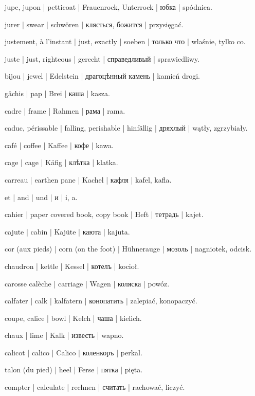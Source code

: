 \begin{outdent}{1em}
jupe, jupon | petticoat | Frauenrock, Unterrock | юбка | spódnica.

jurer | swear | schwören | клясться, божится | przysięgać.

justement, à l’instant | just, exactly | soeben | только что | wlaśnie, tylko co.

juste | just, righteous | gerecht | справедливый | sprawiedliwy.

bijou | jewel | Edelstein | драгоцѣнный камень | kamień drogi.


gâchis | pap | Brei | каша | kasza.

cadre | frame | Rahmen | рама | rama.

caduc, périssable | falling, perishable | hinfällig | дряхлый | wątły, zgrzybiały.

café | coffee | Kaffee | кофе | kawa.

cage | cage | Käfig | клѣтка | klatka.

carreau | earthen pane | Kachel | кафля | kafel, kafla.

et | and | und | и | i, a.

cahier | paper covered book, copy book | Heft | тетрадь | kajet.

cajute | cabin | Kajüte | каюта | kajuta.

cor (aux pieds) | corn (on the foot) | Hühnerauge | мозоль | nagniotek, odcisk.

chaudron | kettle | Kessel | котелъ | kocioł.

carosse calèche | carriage | Wagen | коляска | powóz.

calfater | calk | kalfatern | конопатить | zalepiać, konopaczyć.

coupe, calice | bowl | Kelch | чаша | kielich.

chaux | lime | Kalk | известь | wapno.

calicot | calico | Calico | коленкоръ | perkal.

talon (du pied) | heel | Ferse | пятка | pięta.

compter | calculate | rechnen | считать | rachować, liczyć.


\end{outdent}
